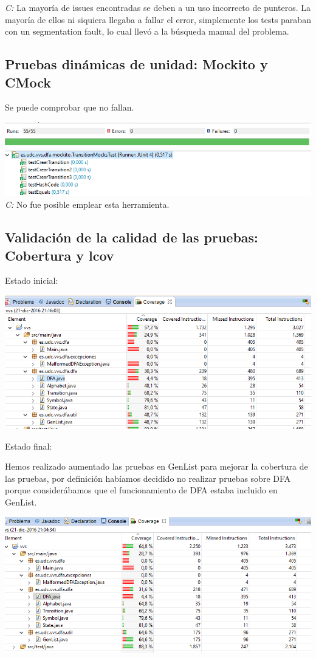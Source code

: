 \documentclass[DIV=calc,paper=a4,fontsize=11pt,onecolumn]{scrartcl} %
\begin{document}
\textit{C:} La mayoría de issues encontradas se deben a un uso incorrecto de punteros. La mayoría de ellos ni siquiera llegaba a fallar el error, simplemente los tests paraban con un segmentation fault, lo cual llevó a la búsqueda manual del problema.
	
\subsection{Pruebas dinámicas de unidad: Mockito y CMock}
Se puede comprobar que no fallan.

\includegraphics[width=15cm]{Imagenes/mockito.png} \\
	
\textit{C:} No fue posible emplear esta herramienta.
	
\subsection{Validación de la calidad de las pruebas: Cobertura y lcov}

Estado inicial:


	\includegraphics[width=15cm]{Imagenes/sinCobertura.png}


Estado final:

Hemos realizado aumentado las pruebas en GenList para mejorar la cobertura de las pruebas, por definición habíamos decidido no realizar pruebas sobre DFA porque considerábamos que el funcionamiento de DFA estaba incluido en GenList.

	\includegraphics[width=15cm]{Imagenes/Cobertura.png}
\end{document}
